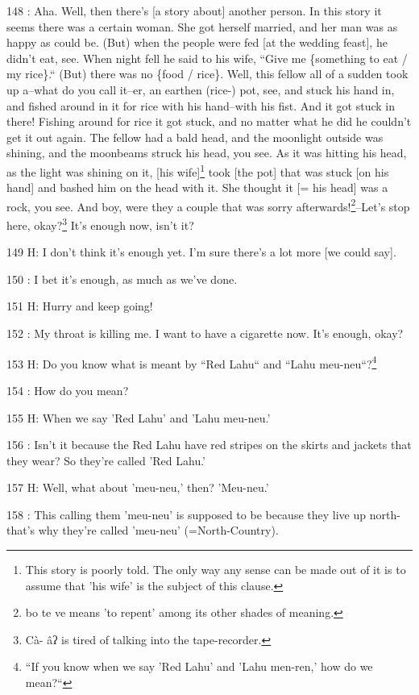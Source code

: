 148  : Aha. Well, then there's [a story about] another person. In this story it
seems there was a certain woman. She got herself married, and her man was as happy
as could be. (But) when the people were fed [at the wedding feast], he didn't eat,
see. When night fell he said to his wife, ``Give me \{something to eat
/ my rice\}.`` (But) there was no \{food / rice\}. Well, this fellow all
of a sudden took up a--what do you call it--er, an earthen (rice-) pot, see, and
stuck his hand in, and fished around in it for rice with his hand--with his fist.
And it got stuck in there! Fishing around for rice it got stuck, and no matter
what he did he couldn't get it out again. The fellow had a bald head, and the moonlight
outside was shining, and the moonbeams struck his head, you see. As it was hitting
his head, as the light was shining on it, [his wife]\footnote{This story is poorly told. The only way any sense can be made out of it is to assume that 'his wife' is the subject of this clause.} took [the pot] that was
stuck [on his hand] and bashed him on the head with it. She thought it [= his head]
was a rock, you see. And boy, were they a couple that was sorry afterwards!\footnote{bo te ve means 'to repent' among its other shades of meaning.}--Let's
stop here, okay?\footnote{Cà- âʔ is tired of talking into the tape-recorder.} It's enough now, isn't it?

149 H: I don't think it's enough yet. I'm sure there's a lot more [we could say].

150  : I bet it's enough, as much as we've done.

151 H: Hurry and keep going!

152  : My throat is killing me. I want to have a cigarette now. It's enough, okay?

153 H: Do you know what is meant by ``Red Lahu`` and ``Lahu
meu-neu``?\footnote{``If you know when we say 'Red Lahu' and 'Lahu men-ren,' how do we mean?``}

154  : How do you mean?

155 H: When we say 'Red Lahu' and 'Lahu meu-neu.'

156  : Isn't it because the Red Lahu have red stripes on the skirts and jackets
that they wear? So they're called 'Red Lahu.'

157 H: Well, what about 'meu-neu,' then? 'Meu-neu.'

158  : This calling them 'meu-neu' is supposed to be because they live up north-that's
why they're called 'meu-neu' (=North-Country).

